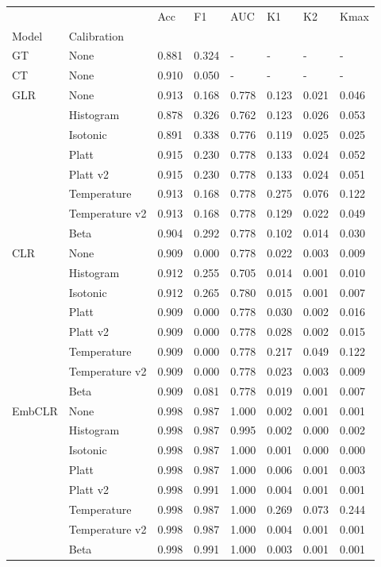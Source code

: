 \begin{tabular}{llllllll}
\toprule
 &  & Acc & F1 & AUC & K1 & K2 & Kmax \\
Model & Calibration &  &  &  &  &  &  \\
\midrule
GT & None & 0.881 & 0.324 & - & - & - & - \\
\cline{1-8}
CT & None & 0.910 & 0.050 & - & - & - & - \\
\cline{1-8}
\multirow[t]{8}{*}{GLR} & None & 0.913 & 0.168 & 0.778 & 0.123 & 0.021 & 0.046 \\
 & Histogram & 0.878 & 0.326 & 0.762 & 0.123 & 0.026 & 0.053 \\
 & Isotonic & 0.891 & 0.338 & 0.776 & 0.119 & 0.025 & 0.025 \\
 & Platt & 0.915 & 0.230 & 0.778 & 0.133 & 0.024 & 0.052 \\
 & Platt v2 & 0.915 & 0.230 & 0.778 & 0.133 & 0.024 & 0.051 \\
 & Temperature & 0.913 & 0.168 & 0.778 & 0.275 & 0.076 & 0.122 \\
 & Temperature v2 & 0.913 & 0.168 & 0.778 & 0.129 & 0.022 & 0.049 \\
 & Beta & 0.904 & 0.292 & 0.778 & 0.102 & 0.014 & 0.030 \\
\cline{1-8}
\multirow[t]{8}{*}{CLR} & None & 0.909 & 0.000 & 0.778 & 0.022 & 0.003 & 0.009 \\
 & Histogram & 0.912 & 0.255 & 0.705 & 0.014 & 0.001 & 0.010 \\
 & Isotonic & 0.912 & 0.265 & 0.780 & 0.015 & 0.001 & 0.007 \\
 & Platt & 0.909 & 0.000 & 0.778 & 0.030 & 0.002 & 0.016 \\
 & Platt v2 & 0.909 & 0.000 & 0.778 & 0.028 & 0.002 & 0.015 \\
 & Temperature & 0.909 & 0.000 & 0.778 & 0.217 & 0.049 & 0.122 \\
 & Temperature v2 & 0.909 & 0.000 & 0.778 & 0.023 & 0.003 & 0.009 \\
 & Beta & 0.909 & 0.081 & 0.778 & 0.019 & 0.001 & 0.007 \\
\cline{1-8}
\multirow[t]{8}{*}{EmbCLR} & None & 0.998 & 0.987 & 1.000 & 0.002 & 0.001 & 0.001 \\
 & Histogram & 0.998 & 0.987 & 0.995 & 0.002 & 0.000 & 0.002 \\
 & Isotonic & 0.998 & 0.987 & 1.000 & 0.001 & 0.000 & 0.000 \\
 & Platt & 0.998 & 0.987 & 1.000 & 0.006 & 0.001 & 0.003 \\
 & Platt v2 & 0.998 & 0.991 & 1.000 & 0.004 & 0.001 & 0.001 \\
 & Temperature & 0.998 & 0.987 & 1.000 & 0.269 & 0.073 & 0.244 \\
 & Temperature v2 & 0.998 & 0.987 & 1.000 & 0.004 & 0.001 & 0.001 \\
 & Beta & 0.998 & 0.991 & 1.000 & 0.003 & 0.001 & 0.001 \\
\cline{1-8}
\bottomrule
\end{tabular}
